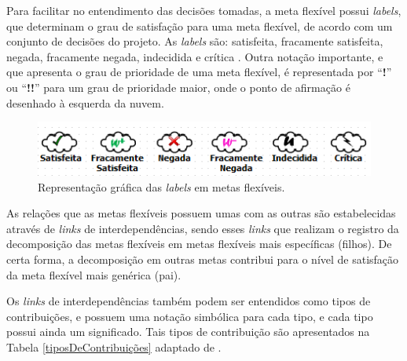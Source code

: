 Para facilitar no entendimento das decisões tomadas, a meta flexível possui \textit{labels}, que determinam o grau de satisfação para uma meta flexível, de acordo com um conjunto de decisões do projeto. As \textit{labels} são: satisfeita, fracamente satisfeita,  negada, fracamente negada, indecidida e crítica \cite{chung2012non}. Outra notação importante, e que apresenta o grau de prioridade de uma meta flexível, é representada por “\textbf{!}” ou “\textbf{!!}” para um grau de prioridade maior, onde o ponto de afirmação é desenhado à esquerda da nuvem.

\begin{figure}[h]
	\centering
	\includegraphics[keepaspectratio=true,scale=0.9]{figuras/labelsSoftgoals.png}
	\caption{Representação gráfica das \textit{labels} em metas flexíveis.}
	\label{fig02}
\end{figure} 

As relações que as metas flexíveis possuem umas com as outras são estabelecidas através de \textit{links} de interdependências, sendo esses \textit{links} que realizam o registro da decomposição das metas flexíveis em metas flexíveis mais específicas (filhos). De certa forma, a decomposição em outras metas contribui para o nível de satisfação da meta flexível mais genérica (pai).

Os \textit{links} de interdependências também podem ser entendidos como tipos de contribuições, e possuem uma notação simbólica para cada tipo, e cada tipo possui ainda um significado.  Tais tipos de contribuição são apresentados na Tabela \ref{tiposDeContribuições} adaptado de  \cite{chung2012non}.



